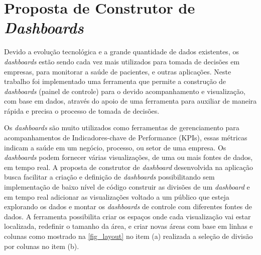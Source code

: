 \documentclass[
	12pt,				%
	openright,			%
	oneside,			%
	a4paper,			%
	english,			%
	brazil				%
	]{abntex2}
\begin{document}
\section{Proposta de Construtor de \textit{Dashboards}}
Devido a evolução tecnológica e a grande quantidade de dados existentes, os \textit{dashboards} estão sendo cada vez mais utilizados para tomada de decisões em empresas, para monitorar a saúde de pacientes, e outras aplicações. 
Neste trabalho foi implementado uma ferramenta que permite a construção de  \textit{dashboards} (painel de controle) para o devido acompanhamento e visualização, com base em dados, através do apoio de uma ferramenta para auxiliar de maneira rápida e precisa o processo de tomada de decisões.

Os  \textit{dashboards} são muito utilizados como ferramentas de gerenciamento para acompanhamentos de Indicadores-chave de Performance (KPIs), essas métricas indicam a saúde em um negócio, processo, ou setor de uma empresa. Os  \textit{dashboards} podem fornecer várias visualizações, de uma ou mais fontes de dados, em tempo real.
A proposta de construtor de \textit{dashboard} desenvolvida na aplicação busca facilitar a criação e definição de  \textit{dashboards} possibilitando sem implementação de baixo nível de código construir as divisões de um  \textit{dashboard} e em tempo real adicionar as visualizações voltado a um público que esteja explorando os dados e montar os \textit{dashboards} de controle com diferentes fontes de dados.
A ferramenta possibilita criar os espaços onde cada visualização vai estar localizada, redefinir o tamanho da área, e criar novas áreas com base em linhas e colunas como mostrado na \autoref{fig_layout} no item (a) realizada a seleção de divisão por colunas no item (b).
\end{document}
